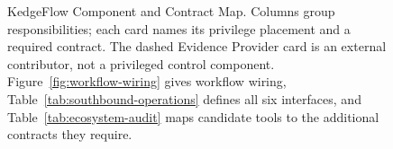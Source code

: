 \begin{figure}[!htbp]
\caption{KedgeFlow Component and Contract Map. Columns group responsibilities;
 each card names its privilege placement and a required contract. The dashed
 Evidence Provider card is an external contributor, not a privileged control
component. Figure~\ref{fig:workflow-wiring} gives workflow wiring,
Table~\ref{tab:southbound-operations} defines all six interfaces, and
 Table~\ref{tab:ecosystem-audit} maps candidate tools to the additional contracts
 they require.}
\label{fig:component-map}
\end{figure}
